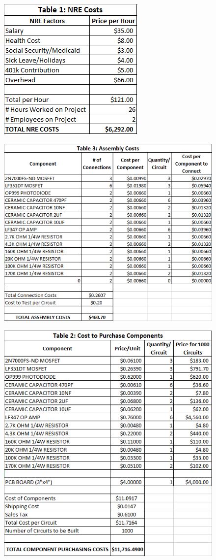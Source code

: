 \documentclass{article}
\begin{document}
\begin{appendices}
	

\begin{figure}[H]
	\centering
	\caption[NRE Costs]{}
	\label{fig:costanalysis}
	\includegraphics[width=0.5\linewidth]{costanalysis}
\end{figure}

\begin{figure}[H]
	\centering
	\caption[Assembly Costs]{}
	\label{fig:assmcosts}
	\includegraphics[width=0.5\linewidth]{assmcosts}
\end{figure}

\begin{figure}[H]
	\centering
	\caption[Component Costs]{}
	\label{fig:compcost}
	\includegraphics[width=0.5\linewidth]{compcost}
\end{figure}

\end{appendices}
\end{document}
